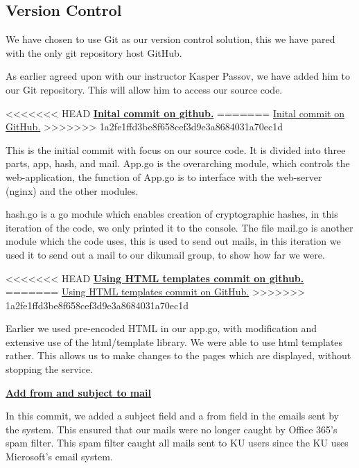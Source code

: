 \documentclass[11pt,a4paper]{report}
\begin{document}
\newpage
\begin{appendices}
\chapter{Version Control}

We have chosen to use Git as our version control solution, this we have pared with the only git repository host GitHub.

As earlier agreed upon with our instructor Kasper Passov, we have added him to our Git repository. This will allow him to access our source code.

<<<<<<< HEAD
\href{https://github.com/Orkeren/DIKU-Keyserver/commit/5e7c7c741fbe6d2e74889e8eaff6173e8c116d46}{\textbf{Inital commit on github.}}
=======
\href{https://github.com/Orkeren/DIKU-Keyserver/commit/5e7c7c741fbe6d2e74889e8eaff6173e8c116d46}{Inital commit on GitHub.}
>>>>>>> 1a2fe1ffd3be8f658cef3d9e3a8684031a70ec1d

This is the initial commit with focus on our source code. It is divided into three parts, app, hash, and mail. App.go is the overarching module, which controls the web-application, the function of App.go is to interface with the web-server (nginx) and the other modules.

hash.go is a go module which enables creation of cryptographic hashes, in this iteration of the code, we only printed it to the console.  The file mail.go is another module which the code uses, this is used to send out mails, in this iteration we used it to send out a mail to our dikumail group, to show how far we were.

<<<<<<< HEAD
\href{https://github.com/Orkeren/DIKU-Keyserver/commit/690f4b0b00dc68e9b529035d7e6e6a6005072d63}{\textbf{Using HTML templates commit on github.}}
=======
\href{https://github.com/Orkeren/DIKU-Keyserver/commit/690f4b0b00dc68e9b529035d7e6e6a6005072d63}{Using HTML templates commit on GitHub.}
>>>>>>> 1a2fe1ffd3be8f658cef3d9e3a8684031a70ec1d

Earlier we used pre-encoded HTML in our app.go, with modification and extensive use of the html/template library. We were able to use html templates rather. This allows us to make changes to the pages which are displayed, without stopping the service.


\href{https://github.com/Orkeren/DIKU-Keyserver/commit/78fd1efa312d4022ecb66a13c0614069a4ff094c}{\textbf{Add from and subject to mail}}

In this commit, we added a subject field and a from field in the emails sent by the system. This ensured that our mails were no longer caught by Office 365's spam filter. This spam filter caught all mails sent to KU users since the KU uses Microsoft's email system.


\end{appendices}
\end{document}

